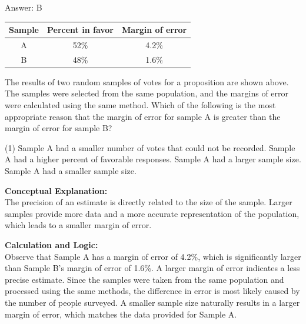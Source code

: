 \documentclass[11pt,paper=a4,answers]{exam}
\begin{document}
\begin{questions}
\begin{solution}
Answer: \colorbox{yellow!100}{B}
\end{solution}

\vspace{60pt}

\question
\begin{center}
\begin{tabular}{|c|c|c|}
\hline
Sample & Percent in favor & Margin of error \\ \hline
A & 52\% & 4.2\% \\ \hline
B & 48\% & 1.6\% \\ \hline
\end{tabular}
\end{center}
The results of two random samples of votes for a proposition are shown above. The samples were selected from the same population, and the margins of error were calculated using the same method. Which of the following is the most appropriate reason that the margin of error for sample A is greater than the margin of error for sample B?
\begin{tasks}(1)
    \task Sample A had a smaller number of votes that could not be recorded.
    \task Sample A had a higher percent of favorable responses.
    \task Sample A had a larger sample size.
    \task Sample A had a smaller sample size.
\end{tasks}

\begin{solution}
\textbf{Conceptual Explanation:} \\
The precision of an estimate is directly related to the size of the sample. Larger samples provide more data and a more accurate representation of the population, which leads to a smaller margin of error.

\vspace{30pt}

\textbf{Calculation and Logic:} \\
Observe that Sample A has a margin of error of 4.2\%, which is significantly larger than Sample B's margin of error of 1.6\%. A larger margin of error indicates a less precise estimate. Since the samples were taken from the same population and processed using the same methods, the difference in error is most likely caused by the number of people surveyed. A smaller sample size naturally results in a larger margin of error, which matches the data provided for Sample A.

\vspace{30pt}


\end{solution}
\end{questions}
\end{document}
